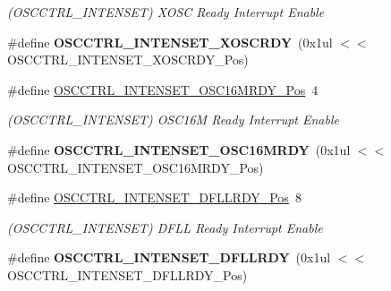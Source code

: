 \begin{DoxyCompactItemize}
\begin{DoxyCompactList}\small\item\em (O\+S\+C\+C\+T\+R\+L\+\_\+\+I\+N\+T\+E\+N\+S\+E\+T) X\+O\+S\+C Ready Interrupt Enable \end{DoxyCompactList}\item 
\hypertarget{group___s_a_m_l21___o_s_c_c_t_r_l_ga9d67bf11dcee8ce66a249c2cc5031309}{}\#define {\bfseries O\+S\+C\+C\+T\+R\+L\+\_\+\+I\+N\+T\+E\+N\+S\+E\+T\+\_\+\+X\+O\+S\+C\+R\+D\+Y}~(0x1ul $<$$<$ O\+S\+C\+C\+T\+R\+L\+\_\+\+I\+N\+T\+E\+N\+S\+E\+T\+\_\+\+X\+O\+S\+C\+R\+D\+Y\+\_\+\+Pos)\label{group___s_a_m_l21___o_s_c_c_t_r_l_ga9d67bf11dcee8ce66a249c2cc5031309}

\item 
\hypertarget{group___s_a_m_l21___o_s_c_c_t_r_l_ga9fc1af980925056466352436c77f0a51}{}\#define \hyperlink{group___s_a_m_l21___o_s_c_c_t_r_l_ga9fc1af980925056466352436c77f0a51}{O\+S\+C\+C\+T\+R\+L\+\_\+\+I\+N\+T\+E\+N\+S\+E\+T\+\_\+\+O\+S\+C16\+M\+R\+D\+Y\+\_\+\+Pos}~4\label{group___s_a_m_l21___o_s_c_c_t_r_l_ga9fc1af980925056466352436c77f0a51}

\begin{DoxyCompactList}\small\item\em (O\+S\+C\+C\+T\+R\+L\+\_\+\+I\+N\+T\+E\+N\+S\+E\+T) O\+S\+C16\+M Ready Interrupt Enable \end{DoxyCompactList}\item 
\hypertarget{group___s_a_m_l21___o_s_c_c_t_r_l_gaa5adb8885642da2f61a273bbe926ee22}{}\#define {\bfseries O\+S\+C\+C\+T\+R\+L\+\_\+\+I\+N\+T\+E\+N\+S\+E\+T\+\_\+\+O\+S\+C16\+M\+R\+D\+Y}~(0x1ul $<$$<$ O\+S\+C\+C\+T\+R\+L\+\_\+\+I\+N\+T\+E\+N\+S\+E\+T\+\_\+\+O\+S\+C16\+M\+R\+D\+Y\+\_\+\+Pos)\label{group___s_a_m_l21___o_s_c_c_t_r_l_gaa5adb8885642da2f61a273bbe926ee22}

\item 
\hypertarget{group___s_a_m_l21___o_s_c_c_t_r_l_gaed032ff8ad78e9e4d9e0694dfbd26c38}{}\#define \hyperlink{group___s_a_m_l21___o_s_c_c_t_r_l_gaed032ff8ad78e9e4d9e0694dfbd26c38}{O\+S\+C\+C\+T\+R\+L\+\_\+\+I\+N\+T\+E\+N\+S\+E\+T\+\_\+\+D\+F\+L\+L\+R\+D\+Y\+\_\+\+Pos}~8\label{group___s_a_m_l21___o_s_c_c_t_r_l_gaed032ff8ad78e9e4d9e0694dfbd26c38}

\begin{DoxyCompactList}\small\item\em (O\+S\+C\+C\+T\+R\+L\+\_\+\+I\+N\+T\+E\+N\+S\+E\+T) D\+F\+L\+L Ready Interrupt Enable \end{DoxyCompactList}\item 
\hypertarget{group___s_a_m_l21___o_s_c_c_t_r_l_ga7877cf0a693c2ab0e1447b54a8fbfd13}{}\#define {\bfseries O\+S\+C\+C\+T\+R\+L\+\_\+\+I\+N\+T\+E\+N\+S\+E\+T\+\_\+\+D\+F\+L\+L\+R\+D\+Y}~(0x1ul $<$$<$ O\+S\+C\+C\+T\+R\+L\+\_\+\+I\+N\+T\+E\+N\+S\+E\+T\+\_\+\+D\+F\+L\+L\+R\+D\+Y\+\_\+\+Pos)\label{group___s_a_m_l21___o_s_c_c_t_r_l_ga7877cf0a693c2ab0e1447b54a8fbfd13}


\end{DoxyCompactItemize}
